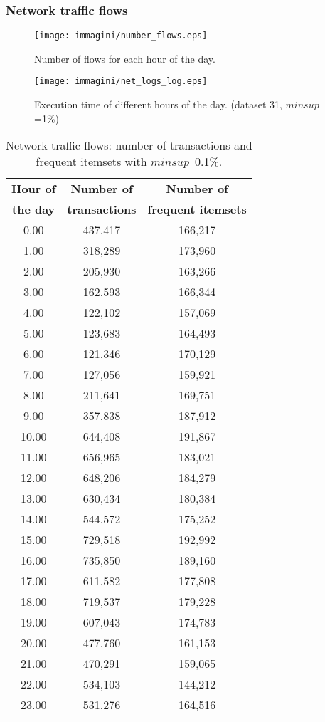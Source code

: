 \subsubsection{Network traffic flows}
\label{net_exp}


\begin{figure}[!t]
\texttt{[image: immagini/number\_flows.eps]}
\caption{Number of flows for each hour of the day.}
\label{number_flows}
\end{figure}

\begin{figure}[!t]
\texttt{[image: immagini/net\_logs\_log.eps]}
\caption{Execution time of different hours of the day.
(dataset 31, $minsup$=1\%)}
\label{net}
\end{figure}


\begin{table}[h!]
\scriptsize
\begin{center}
\caption{Network traffic flows: number of transactions and frequent itemsets
with $minsup$~0.1\%.}
\label{netlog_itemsets}
\begin{tabular}{|c|c|c|}
\hline
{\bf Hour of}	& {\bf Number of} 	& {\bf	Number of} \\
{\bf the day}	& {\bf transactions} 	& {\bf	frequent itemsets} \\
\hline \hline
0.00  & 437,417 & 166,217 \\ \hline
1.00  & 318,289 & 173,960 \\ \hline
2.00  & 205,930 & 163,266 \\ \hline
3.00  & 162,593 & 166,344 \\ \hline
4.00  & 122,102 & 157,069 \\ \hline
5.00  & 123,683 & 164,493 \\ \hline
6.00  & 121,346 & 170,129 \\ \hline
7.00  & 127,056 & 159,921 \\ \hline
8.00  & 211,641 & 169,751 \\ \hline
9.00  & 357,838 & 187,912 \\ \hline
10.00 & 644,408 & 191,867 \\ \hline
11.00 & 656,965 & 183,021 \\ \hline
12.00 & 648,206 & 184,279 \\ \hline
13.00 & 630,434 & 180,384 \\ \hline
14.00 & 544,572 & 175,252 \\ \hline
15.00 & 729,518 & 192,992 \\ \hline
16.00 & 735,850 & 189,160 \\ \hline
17.00 & 611,582 & 177,808 \\ \hline
18.00 & 719,537 & 179,228 \\ \hline
19.00 & 607,043 & 174,783 \\ \hline
20.00 & 477,760 & 161,153 \\ \hline
21.00 & 470,291 & 159,065 \\ \hline
22.00 & 534,103 & 144,212 \\ \hline
23.00 & 531,276 & 164,516 \\ \hline
\end{tabular}
\end{center}
\end{table}

